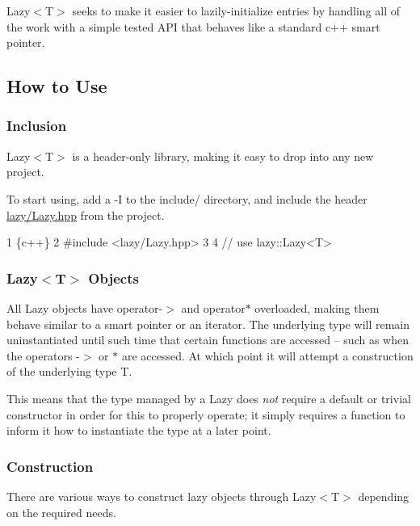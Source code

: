 {\ttfamily Lazy$<$T$>$} seeks to make it easier to lazily-\/initialize entries by handling all of the work with a simple tested A\+PI that behaves like a standard c++ smart pointer.

\subsection*{How to Use}

\subsubsection*{Inclusion}

{\ttfamily Lazy$<$T$>$} is a header-\/only library, making it easy to drop into any new project.

To start using, add a {\ttfamily -\/I} to the {\ttfamily include/} directory, and include the header {\ttfamily \hyperlink{_lazy_8hpp}{lazy/\+Lazy.\+hpp}} from the project.


\begin{DoxyCode}
1 \{c++\}
2 #include <lazy/Lazy.hpp>
3 
4 // use lazy::Lazy<T> 
\end{DoxyCode}


\subsubsection*{{\ttfamily Lazy$<$T$>$} Objects}

All {\ttfamily Lazy} objects have {\ttfamily operator-\/$>$} and {\ttfamily operator$\ast$} overloaded, making them behave similar to a smart pointer or an iterator. The underlying type will remain uninstantiated until such time that certain functions are accessed -- such as when the operators {\ttfamily -\/$>$} or {\ttfamily $\ast$} are accessed. At which point it will attempt a construction of the underlying type {\ttfamily T}.

This means that the type managed by a {\ttfamily Lazy} does {\itshape not} require a default or trivial constructor in order for this to properly operate; it simply requires a function to inform it how to instantiate the type at a later point.

\subsubsection*{Construction}

There are various ways to construct lazy objects through {\ttfamily Lazy$<$T$>$} depending on the required needs.


